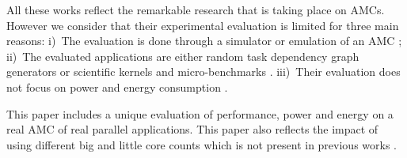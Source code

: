

All these works reflect the remarkable research that is taking place on AMCs. 
However we consider that their experimental evaluation is limited for three main reasons:
i)~The evaluation is done through a simulator or emulation of an AMC 
\cite{Kumar_micro_2003, Morad_area_based, Balakrishnan:ISCA2005, 
Koufaty_bias, VanCraeynest_fairness, VanCraeynest_PIE, Rodrigues_thread_scheduling, Hetero93, 
Hetero95, Dup09, Suleman:APLOS2009, Joao:ASPLOS2012,Joao:ISCA2013};
ii)~The evaluated applications are either random task dependency graph generators or scientific 
kernels and micro-benchmarks \cite{Hetero93,HEFT,LDCP}.
iii)~Their evaluation does not focus on power and energy consumption 
\cite{Kumar:ISCA2004, 
VanCraeynest_fairness, VanCraeynest_PIE, Hetero95, Chronaki:ICS2015}.

This paper includes a unique evaluation of performance, power and energy on a real AMC of real parallel applications.
This paper also reflects the impact of using different big and little core counts which is not present in previous works \cite{Cong_quickIA}.









































